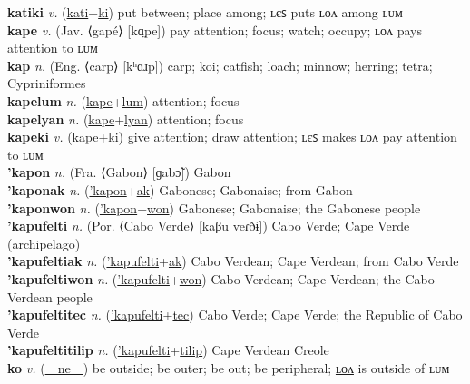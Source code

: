 \textbf{katiki} \textit{v.} (\hyperref[kati]{kati}+\hyperref[ki]{ki})
put between; place among; ʟєꜱ puts ʟᴏᴧ among ʟᴜᴍ \label{katiki} \\
\textbf{kape} \textit{v.} (Jav. ⟨gapé⟩ [kɑ̤pe])
pay attention; focus; watch; occupy; ʟᴏᴧ pays attention to \hyperref[kapelum]{ʟᴜᴍ} \label{kape} \\
\textbf{kap} \textit{n.} (Eng. ⟨carp⟩ [kʰɑɹp])
carp; koi; catfish; loach; minnow; herring; tetra; Cypriniformes \label{kap} \\
\textbf{kapelum} \textit{n.} (\hyperref[kape]{kape}+\hyperref[lum]{lum})
attention; focus \label{kapelum} \\
\textbf{kapelyan} \textit{n.} (\hyperref[kape]{kape}+\hyperref[lyan]{lyan})
attention; focus \label{kapelyan} \\
\textbf{kapeki} \textit{v.} (\hyperref[kape]{kape}+\hyperref[ki]{ki})
give attention; draw attention; ʟєꜱ makes ʟᴏᴧ pay attention to ʟᴜᴍ \label{kapeki} \\
\textbf{'kapon} \textit{n.} (Fra. ⟨Gabon⟩ [ɡabɔ̃])
Gabon \label{'kapon} \\
\textbf{'kaponak} \textit{n.} (\hyperref['kapon]{'kapon}+\hyperref[ak]{ak})
Gabonese; Gabonaise; from Gabon \label{'kaponak} \\
\textbf{'kaponwon} \textit{n.} (\hyperref['kapon]{'kapon}+\hyperref[won]{won})
Gabonese; Gabonaise; the Gabonese people \label{'kaponwon} \\
\textbf{'kapufelti} \textit{n.} (Por. ⟨Cabo Verde⟩ [kaβu veɾðɨ])
Cabo Verde; Cape Verde (archipelago) \label{'kapufelti} \\
\textbf{'kapufeltiak} \textit{n.} (\hyperref['kapufelti]{'kapufelti}+\hyperref[ak]{ak})
Cabo Verdean; Cape Verdean; from Cabo Verde \label{'kapufeltiak} \\
\textbf{'kapufeltiwon} \textit{n.} (\hyperref['kapufelti]{'kapufelti}+\hyperref[won]{won})
Cabo Verdean; Cape Verdean; the Cabo Verdean people \label{'kapufeltiwon} \\
\textbf{'kapufeltitec} \textit{n.} (\hyperref['kapufelti]{'kapufelti}+\hyperref[tec]{tec})
Cabo Verde; Cape Verde; the Republic of Cabo Verde \label{'kapufeltitec} \\
\textbf{'kapufeltitilip} \textit{n.} (\hyperref['kapufelti]{'kapufelti}+\hyperref[tilip]{tilip})
Cape Verdean Creole \label{'kapufeltitilip} \\
\textbf{ko} \textit{v.} (\hyperref[ne]{~~ne~~})
be outside; be outer; be out; be peripheral; \hyperref[kolon]{ʟᴏᴧ} is outside of ʟᴜᴍ \label{ko} \\
